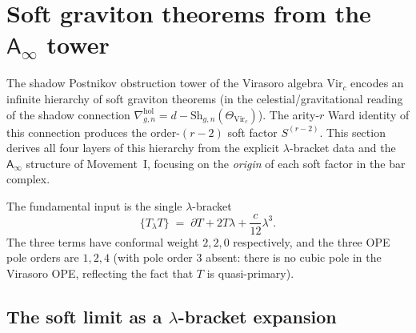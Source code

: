 \documentclass[11pt]{article}
\newcommand{\Ainf}{\mathsf{A}_{\infty}}
\begin{document}
\section{Soft graviton theorems from the $\Ainf$ tower}
\label{sec:soft-graviton-ainf-tower}

The shadow Postnikov obstruction tower of the Virasoro algebra
$\mathrm{Vir}_c$ encodes an infinite hierarchy of soft
graviton theorems (in the celestial/gravitational reading of
the shadow connection $\nabla^{\mathrm{hol}}_{g,n} =
d - \mathrm{Sh}_{g,n}(\Theta_{\mathrm{Vir}_c})$).
The arity-$r$ Ward identity of this connection produces
the order-$(r-2)$ soft factor $S^{(r-2)}$.  This section
derives all four layers of this hierarchy from the explicit
$\lambda$-bracket data and the $\Ainf$ structure of
Movement~I, focusing on the \emph{origin} of each soft factor
in the bar complex.

The fundamental input is the single $\lambda$-bracket
\begin{equation}\label{eq:soft-input}
\{T{}_\lambda T\}
\;=\;
\partial T + 2T\lambda + \frac{c}{12}\lambda^3.
\end{equation}
The three terms have conformal weight $2, 2, 0$ respectively,
and the three OPE pole orders are $1, 2, 4$ (with pole order 3
absent: there is no cubic pole in the Virasoro OPE, reflecting
the fact that $T$ is quasi-primary).

\subsection{The soft limit as a $\lambda$-bracket expansion}
\end{document}
